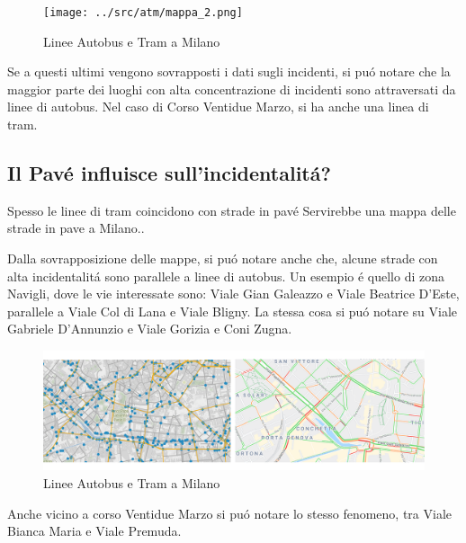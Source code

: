\documentclass[a4paper]{report}
\begin{document}
\begin{figure}[!ht]
    \texttt{[image: ../src/atm/mappa\_2.png]}
    \caption{Linee Autobus e Tram a Milano}
    \label{fig:geo_trasporti}
\end{figure}

Se a questi ultimi vengono sovrapposti i dati sugli incidenti, 
si pu\'o notare che la maggior parte dei luoghi con alta concentrazione di incidenti sono 
attraversati da linee di autobus. Nel caso di Corso Ventidue Marzo, si ha anche una linea di tram.





\newpage
\subsection{Il Pav\'e influisce sull'incidentalit\'a?} Spesso le linee di tram coincidono con
strade in pav\'e
Servirebbe una mappa delle strade in pave a Milano..

Dalla sovrapposizione delle mappe, si pu\'o notare anche che, alcune strade con alta incidentalit\'a 
sono parallele a linee di autobus. Un esempio \'e quello di zona Navigli, 
dove le vie interessate sono:
Viale Gian Galeazzo e Viale Beatrice D'Este, parallele a Viale Col di Lana e Viale Bligny.
La stessa cosa si pu\'o notare su Viale Gabriele D'Annunzio e Viale Gorizia e Coni Zugna.

\begin{figure}[!ht]
    \includegraphics[width=\linewidth]{../src/atm/navigli.png}
    \caption{Linee Autobus e Tram a Milano}
    \label{fig:navigli}
\end{figure}

Anche vicino a corso Ventidue Marzo si pu\'o notare lo stesso fenomeno, 
tra Viale Bianca Maria e Viale Premuda.
\end{document}
